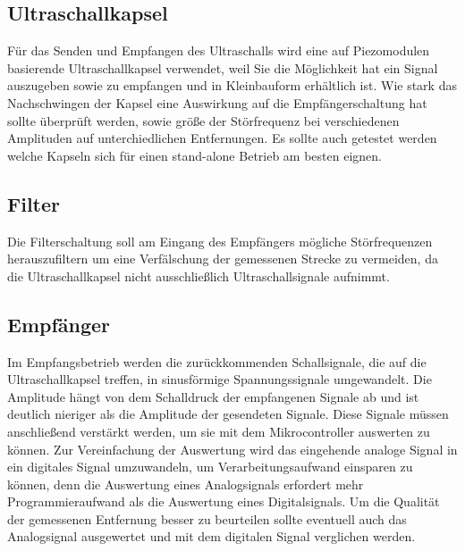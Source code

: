 \subsection{Ultraschallkapsel}
Für das Senden und Empfangen des Ultraschalls wird eine auf Piezomodulen basierende Ultraschallkapsel verwendet, weil Sie die Möglichkeit hat ein Signal auszugeben sowie zu empfangen und in Kleinbauform erhältlich ist. Wie stark das Nachschwingen der Kapsel eine Auswirkung auf die Empfängerschaltung hat sollte überprüft werden, sowie größe der Störfrequenz bei verschiedenen Amplituden auf unterchiedlichen Entfernungen. Es sollte auch getestet werden welche Kapseln sich für einen stand-alone Betrieb am besten eignen.

\subsection{Filter}
Die Filterschaltung soll am Eingang des Empfängers mögliche Störfrequenzen herauszufiltern um eine Verfälschung der gemessenen Strecke zu vermeiden, da die Ultraschallkapsel nicht ausschließlich Ultraschallsignale aufnimmt.

\subsection{Empfänger}
Im Empfangsbetrieb werden die zurückkommenden Schallsignale, die auf die Ultraschallkapsel treffen, in sinusförmige Spannungssignale umgewandelt. Die Amplitude hängt von dem Schalldruck der empfangenen Signale ab und ist deutlich nieriger als die Amplitude der gesendeten Signale. Diese Signale müssen anschließend verstärkt werden, um sie mit dem Mikrocontroller auswerten zu können. Zur Vereinfachung der Auswertung wird das eingehende analoge Signal in ein digitales Signal umzuwandeln, um Verarbeitungsaufwand einsparen zu können, denn die Auswertung eines Analogsignals erfordert mehr Programmieraufwand als die Auswertung eines Digitalsignals. Um die Qualität der gemessenen Entfernung besser zu beurteilen sollte eventuell auch das Analogsignal ausgewertet und mit dem digitalen Signal verglichen werden. 












